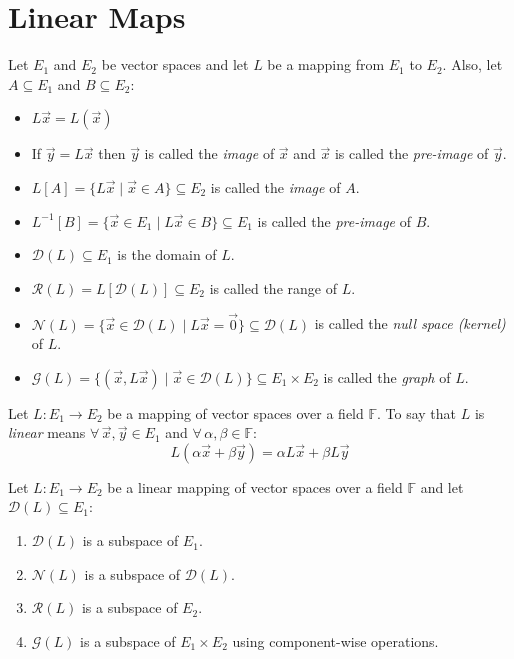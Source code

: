 \documentclass[letterpaper,12pt,fleqn]{article}
\newcommand{\vx}{\vec{x}}
\newcommand{\vy}{\vec{y}}
\newcommand{\vo}{\vec{0}}
\renewcommand{\d}{\mathcal{D}}
\renewcommand{\r}{\mathcal{R}}
\newcommand{\n}{\mathcal{N}}
\newcommand{\g}{\mathcal{G}}
\newcommand{\F}{\mathbb{F}}
\renewcommand{\a}{\alpha}
\renewcommand{\b}{\beta}
\begin{document}
\section*{Linear Maps}

\begin{notation}
  Let $E_1$ and $E_2$ be vector spaces and let $L$ be a mapping from $E_1$ to
  $E_2$. Also, let $A\subseteq E_1$ and $B\subseteq E_2$:
  \begin{itemize}
  \item $L\vx=L(\vx)$
  \item If $\vy=L\vx$ then $\vy$ is called the \emph{image} of $\vx$ and
    $\vx$ is called the \emph{pre-image} of $\vy$.
  \item $L[A]=\{L\vx\mid\vx\in A\}\subseteq E_2$ is called the \emph{image} of
    $A$.
  \item $L^{-1}[B]=\{\vx\in E_1\mid L\vx\in B\}\subseteq E_1$ is called the
    \emph{pre-image} of $B$.
  \item $\d(L)\subseteq E_1$ is the domain of $L$.
  \item $\r(L)=L[\d(L)]\subseteq E_2$ is called the range of $L$.
  \item $\n(L)=\{\vx\in\d(L)\mid L\vx=\vo\}\subseteq\d(L)$ is called the
    \emph{null space (kernel)} of $L$.
  \item $\g(L)=\{(\vx,L\vx)\mid\vx\in\d(L)\}\subseteq E_1\times E_2$ is called
    the \emph{graph} of $L$.
  \end{itemize}
\end{notation}

\begin{definition}[Linear]
  Let $L:E_1\to E_2$ be a mapping of vector spaces over a field $\F$. To say
  that $L$ is \emph{linear} means $\forall\,\vx,\vy\in E_1$ and
  $\forall\,\a,\b\in\F$:
  \[L(\a\vx+\b\vy)=\a L\vx+\b L\vy\]
\end{definition}

\begin{theorem}
  Let $L:E_1\to E_2$ be a linear mapping of vector spaces over a field $\F$ and
  let $\d(L)\subseteq E_1$:
  \begin{enumerate}
  \item $\d(L)$ is a subspace of $E_1$.
  \item $\n(L)$ is a subspace of $\d(L)$.
  \item $\r(L)$ is a subspace of $E_2$.
  \item $\g(L)$ is a subspace of $E_1\times E_2$ using component-wise
    operations.
  \end{enumerate}
\end{theorem}
\end{document}
